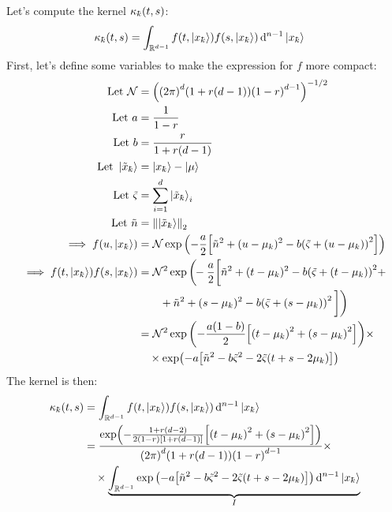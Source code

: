 \documentclass[12pt]{article}
\newcommand{\kbar}{\mathchar'26\mkern-9mu k}
\numberwithin{theorem}{section}
\numberwithin{equation}{section}
\numberwithin{figure}{section}
\begin{document}
Let's compute the kernel \(\kappa_{\kbar}\qty(t, s)\):
\begin{align*}
    \kappa_{\kbar}\qty(t, s) &= \int_{\mathbb{R}^{d-1}} f\qty(t, \ket{x_{\kbar}})f\qty(s, \ket{x_{\kbar}}) \dd[n-1]{\ket{x_{\kbar}}}
\end{align*}
First, let's define some variables to make the expression for \(f\) more
compact:
\begin{align*}
    \text{Let }\mathcal{N} &= \qty(\qty(2\pi)^{d}\qty(1 + r\qty(d - 1))\qty(1-r)^{d-1})^{-1 / 2} \\
    \text{Let } a &= \frac{1}{1-r} \\
    \text{Let } b &= \frac{r}{1 + r\qty(d-1)} \\
    \text{Let } \ket{\tilde{x}_{\kbar}} &= \ket{x_{\kbar}} - \ket{\mu} \\
    \text{Let } \tilde{\varsigma} &= \sum_{i=1}^{d}\ket{\tilde{x}_{\kbar}}_i \\
    \text{Let } \tilde{n} &= \norm{\ket{\tilde{x}_{\kbar}}}_2 \\
    \implies f(u, \ket{x_{\kbar}}) &= \mathcal{N} \exp\qty(-\frac{a}{2}\qty[\tilde{n}^2 + (u - \mu_k)^2 - b\qty(\tilde{\varsigma} + \qty(u - \mu_k))^2]) \\
    \implies f\qty(t, \ket{x_{\kbar}})f\qty(s, \ket{x_{\kbar}}) &= \mathcal{N}^2 \exp\bigg(\!\!-\frac{a}{2}\bigg[\tilde{n}^2 + (t - \mu_k)^2 - b\qty(\tilde{\varsigma} + \qty(t - \mu_k))^2 + \\
                             &\qquad + \tilde{n}^2 + (s - \mu_k)^2 - b\qty(\tilde{\varsigma} + \qty(s - \mu_k))^2\,\bigg]\bigg) \\
                             &= \mathcal{N}^2 \exp\qty(-\frac{a\qty(1 - b)}{2}\qty[\qty(t - \mu_k)^2 + \qty(s - \mu_k)^2]) \times \\
                             &\quad\times \exp(-a\qty[\tilde{n}^2 - b \tilde{\varsigma}^2 - 2\tilde{\varsigma}\qty(t + s - 2\mu_k)])
\end{align*}
The kernel is then:
\begin{align*}
    \kappa_{\kbar}\qty(t, s) &= \int_{\mathbb{R}^{d-1}} f\qty(t, \ket{x_{\kbar}})f\qty(s, \ket{x_{\kbar}}) \dd[n-1]{\ket{x_{\kbar}}} \\
                             &= \frac{\exp(-\frac{1 + r\qty(d - 2)}{2\qty(1-r)\qty[1 + r\qty(d-1)]}\qty[\qty(t - \mu_k)^2 + \qty(s - \mu_k)^2])}{\qty(2\pi)^{d}\qty(1 + r\qty(d-1))\qty(1-r)^{d-1}} \times \\
                             &\quad \times \underbrace{\int_{\mathbb{R}^{d-1}} \exp\qty(-a\qty[\tilde{n}^2 - b \tilde{\varsigma}^2 - 2\tilde{\varsigma}\qty(t + s - 2\mu_k)]) \dd[n-1]{\ket{x_{\kbar}}}}_{I}
\end{align*}
\end{document}
